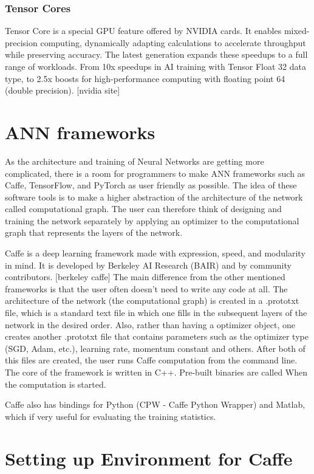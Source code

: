 \subsubsection{Tensor Cores}

Tensor Core is a special GPU feature offered by NVIDIA cards. It enables mixed-precision computing, dynamically adapting calculations to accelerate throughput while preserving accuracy. The latest generation expands these speedups to a full range of workloads. From 10x speedups in AI training with Tensor Float 32 data type, to 2.5x boosts for high-performance computing with floating point 64 (double precision). [nvidia site]

\section{ANN frameworks}

As the architecture and training of Neural Networks are getting more complicated, there is a room for programmers to make ANN frameworks such as Caffe, TensorFlow, and PyTorch as user friendly as possible. The idea of these software tools is to make a higher abstraction of the architecture of the network called computational graph. The user can therefore think of designing and training the network separately by applying an optimizer to the computational graph that represents the layers of the network. 

Caffe is a deep learning framework made with expression, speed, and modularity in mind. It is developed by Berkeley AI Research (BAIR) and by community contributors. [berkeley caffe] The main difference from the other mentioned frameworks is that the user often doesn't need to write any code at all. The architecture of the network (the computational graph) is created in a .prototxt file, which is a standard text file in which one fills in the subsequent layers of the network in the desired order. Also, rather than having a optimizer object, one creates another .prototxt file that contains parameters such as the optimizer type (SGD, Adam, etc.), learning rate, momentum constant and others. After both of this files are created, the user runs Caffe computation from the command line. The core of the framework is written in C++. Pre-built binaries are called When the computation is started.

Caffe also has bindings for Python (CPW - Caffe Python Wrapper) and Matlab, which if very useful for evaluating the training statistics. 

\section{Setting up Environment for Caffe}

